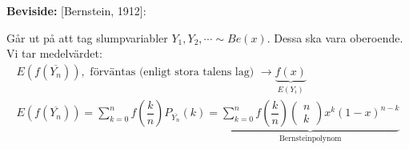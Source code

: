 \par\bigskip
\noindent\textbf{Beviside:} [Bernstein, 1912]:\par
\noindent Går ut på att tag slumpvariabler $Y_1,Y_2,\cdots\sim Be(x)$. Dessa ska vara oberoende. Vi tar medelvärdet:
\begin{equation*}
  \begin{gathered}
    E(f(\overline{Y_n})),\text{ förväntas (enligt stora talens lag) }\to \underbrace{f(x)}_{\text{$E(Y_i)$}}\\
    E(f(\overline{Y_n})) = \sum_{k=0}^{n}f\left(\dfrac{k}{n}\right)P_{\overline{Y_n}}(k) = \underbrace{\sum_{k=0}^{n}f\left(\dfrac{k}{n}\right)\begin{pmatrix}n\\k\end{pmatrix}x^k(1-x)^{n-k}}_{\text{Bernsteinpolynom}}
  \end{gathered}
\end{equation*}
